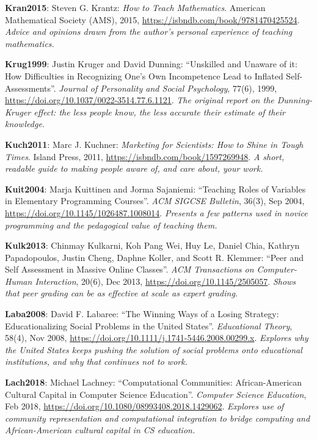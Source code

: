 \textbf{\hypertarget{b:Kran2015}{Kran2015}\label{b:Kran2015}}: Steven G. Krantz: \emph{How to Teach Mathematics}. American Mathematical Society (AMS), 2015, \url{https://isbndb.com/book/9781470425524}. \emph{Advice and opinions drawn from the author's personal experience of teaching mathematics.}

\textbf{\hypertarget{b:Krug1999}{Krug1999}\label{b:Krug1999}}: Justin Kruger and David Dunning: ``Unskilled and Unaware of it: How Difficulties in Recognizing One's Own Incompetence Lead to Inflated Self-Assessments''. \emph{Journal of Personality and Social Psychology}, 77(6), 1999, \url{https://doi.org/10.1037/0022-3514.77.6.1121}. \emph{The original report on the Dunning-Kruger effect: the less people know, the less accurate their estimate of their knowledge.}

\textbf{\hypertarget{b:Kuch2011}{Kuch2011}\label{b:Kuch2011}}: Marc J. Kuchner: \emph{Marketing for Scientists: How to Shine in Tough Times}. Island Press, 2011, \url{https://isbndb.com/book/1597269948}. \emph{A short, readable guide to making people aware of, and care about, your work.}

\textbf{\hypertarget{b:Kuit2004}{Kuit2004}\label{b:Kuit2004}}: Marja Kuittinen and Jorma Sajaniemi: ``Teaching Roles of Variables in Elementary Programming Courses''. \emph{ACM SIGCSE Bulletin}, 36(3), Sep 2004, \url{https://doi.org/10.1145/1026487.1008014}. \emph{Presents a few patterns used in novice programming and the pedagogical value of teaching them.}

\textbf{\hypertarget{b:Kulk2013}{Kulk2013}\label{b:Kulk2013}}: Chinmay Kulkarni, Koh Pang Wei, Huy Le, Daniel Chia, Kathryn Papadopoulos, Justin Cheng, Daphne Koller, and Scott R. Klemmer: ``Peer and Self Assessment in Massive Online Classes''. \emph{ACM Transactions on Computer-Human Interaction}, 20(6), Dec 2013, \url{https://doi.org/10.1145/2505057}. \emph{Shows that peer grading can be as effective at scale as expert grading.}

\textbf{\hypertarget{b:Laba2008}{Laba2008}\label{b:Laba2008}}: David F. Labaree: ``The Winning Ways of a Losing Strategy: Educationalizing Social Problems in the United States''. \emph{Educational Theory}, 58(4), Nov 2008, \url{https://doi.org/10.1111/j.1741-5446.2008.00299.x}. \emph{Explores why the United States keeps pushing the solution of social problems onto educational institutions, and why that continues not to work.}

\textbf{\hypertarget{b:Lach2018}{Lach2018}\label{b:Lach2018}}: Michael Lachney: ``Computational Communities: African-American Cultural Capital in Computer Science Education''. \emph{Computer Science Education}, Feb 2018, \url{https://doi.org/10.1080/08993408.2018.1429062}. \emph{Explores use of community representation and computational integration to bridge computing and African-American cultural capital in CS education.}


